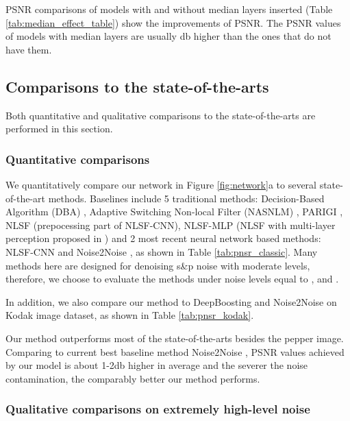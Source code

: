 \documentclass[journal]{IEEEtran}
\begin{document}
PSNR comparisons of models with and without median layers inserted (Table \ref{tab:median_effect_table}) show the improvements of PSNR. The PSNR values of models with median layers are usually db higher than the ones that do not have them.


\subsection{Comparisons to the state-of-the-arts} \label{sec:compare}

Both quantitative and qualitative comparisons to the state-of-the-arts are performed in this section.

\subsubsection{Quantitative comparisons} \label{sec:quantCompare}

We quantitatively compare our network in Figure \ref{fig:network}a to several state-of-the-art methods. Baselines include 5 traditional methods: Decision-Based
Algorithm (DBA) \cite{Srinivasan2007SPL}, Adaptive Switching Non-local Filter (NASNLM) \cite{Varghese2015}, PARIGI \cite{Julie2016}, NLSF \cite{Fu2018Multimedia} (prepocessing part of NLSF-CNN), NLSF-MLP (NLSF with multi-layer perception proposed in \cite{Burger2012}) and 2 most recent neural network based methods: NLSF-CNN \cite{Fu2018Multimedia} and Noise2Noise \cite{Lehtinen2018}, as shown in Table \ref{tab:pnsr_classic}. Many methods here are designed for denoising s\&p noise with moderate levels, therefore, we choose to evaluate the methods under noise levels equal to ,  and .

In addition, we also compare our method to DeepBoosting \cite{chen2018DeepBoosting} and Noise2Noise \cite{Lehtinen2018} on Kodak image dataset, as shown in Table \ref{tab:pnsr_kodak}.

Our method outperforms most of the state-of-the-arts besides the pepper image. Comparing to current best baseline method Noise2Noise \cite{Lehtinen2018}, PSNR values achieved by our model is about 1-2db higher in average and the severer the noise contamination, the comparably better our method performs.

\subsubsection{Qualitative comparisons on extremely high-level noise}
\end{document}
